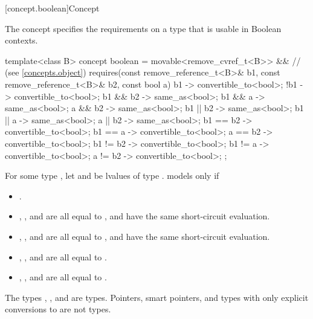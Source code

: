 [concept.boolean]{Concept }

\pnum
The  concept specifies the requirements on a type that is
usable in Boolean contexts.

%
\begin{itemdecl}
template<class B>
  concept boolean =
    movable<remove_cvref_t<B>> &&       // (see \ref{concepts.object})
    requires(const remove_reference_t<B>& b1,
             const remove_reference_t<B>& b2, const bool a) {
      { b1 } -> convertible_to<bool>;
      { !b1 } -> convertible_to<bool>;
      { b1 && b2 } -> same_as<bool>;
      { b1 &&  a } -> same_as<bool>;
      {  a && b2 } -> same_as<bool>;
      { b1 || b2 } -> same_as<bool>;
      { b1 ||  a } -> same_as<bool>;
      {  a || b2 } -> same_as<bool>;
      { b1 == b2 } -> convertible_to<bool>;
      { b1 ==  a } -> convertible_to<bool>;
      {  a == b2 } -> convertible_to<bool>;
      { b1 != b2 } -> convertible_to<bool>;
      { b1 !=  a } -> convertible_to<bool>;
      {  a != b2 } -> convertible_to<bool>;
    };
\end{itemdecl}

\pnum
For some type , let  and  be
lvalues of type .
 models  only if

\begin{itemize}
\item {}.
\item {}, , and
       are all equal to
      , and have the same short-circuit
      evaluation.
\item {}, , and
       are all equal to
      , and have the same short-circuit
      evaluation.
\item {}, , and
       are all equal to
      .
\item {}, , and
       are all equal to
      .
\end{itemize}

\pnum
\begin{example}
The types , , and
 are 
types. Pointers, smart pointers, and types with only explicit conversions to
 are not  types.
\end{example}


